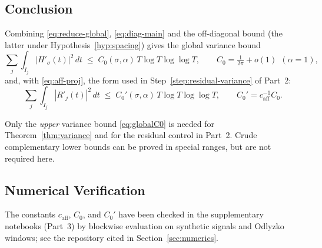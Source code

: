 \subsection{Conclusion}

Combining \eqref{eq:reduce-global}, \eqref{eq:diag-main} and the off-diagonal
bound (the latter under Hypothesis~\ref{hyp:spacing}) gives the global variance
bound
\begin{equation}
\sum_j\int_{I_j}\!|H'_\sigma(t)|^2\,dt
\;\le\; C_0(\sigma,\alpha)\, T\log T\log\log T,
\qquad C_0=\tfrac{1}{2\pi}+o(1)\ \ (\alpha=1),
\label{eq:globalC0}
\end{equation}
and, with \eqref{eq:aff-proj}, the form used in
Step~\ref{step:residual-variance} of Part~2:
\begin{equation}
\sum_j\int_{I_j}\!|R'_j(t)|^2\,dt
\;\le\; C_0'(\sigma,\alpha)\, T\log T\log\log T,
\qquad C_0' = c_{\mathrm{aff}}^{-1} C_0.
\label{eq:residC0prime}
\end{equation}

\begin{remark}
Only the \emph{upper} variance bound \eqref{eq:globalC0} is needed for
Theorem~\ref{thm:variance} and for the residual control in Part~2.
Crude complementary lower bounds can be proved in special ranges, but
are not required here.
\end{remark}

\subsection{Numerical Verification}
The constants $c_{\mathrm{aff}}$, $C_0$, and $C_0'$ have been checked in the
supplementary notebooks (Part~3) by blockwise evaluation on synthetic signals
and Odlyzko windows; see the repository cited in Section~\ref{sec:numerics}.
